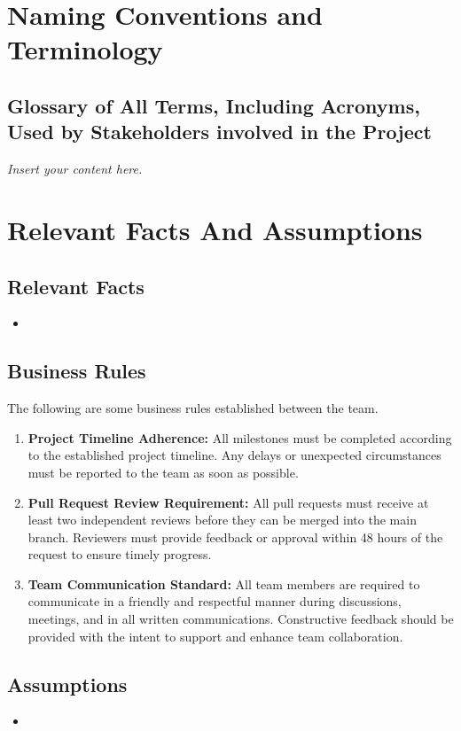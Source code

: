 \documentclass[12pt]{article}
\newcommand{\lips}{\textit{Insert your content here.}}
\begin{document}
\section{Naming Conventions and Terminology}
\subsection{Glossary of All Terms, Including Acronyms, Used by Stakeholders
involved in the Project}
\lips

\section{Relevant Facts And Assumptions}
\subsection{Relevant Facts}
\begin{itemize}
  \item 
\end{itemize}

\subsection{Business Rules}

The following are some business rules established between the team.

\begin{enumerate}
  \item \textbf{Project Timeline Adherence:} All milestones must be completed according to the established project timeline. Any delays or unexpected circumstances must be reported to the team as soon as possible.
  \item \textbf{Pull Request Review Requirement:} All pull requests must receive at least two independent reviews before they can be merged into the main branch. Reviewers must provide feedback or approval within 48 hours of the request to ensure timely progress.
  \item \textbf{Team Communication Standard:} All team members are required to communicate in a friendly and respectful manner during discussions, meetings, and in all written communications. Constructive feedback should be provided with the intent to support and enhance team collaboration.
\end{enumerate}


\subsection{Assumptions}
\begin{itemize}
  \item 
\end{itemize}
\end{document}
